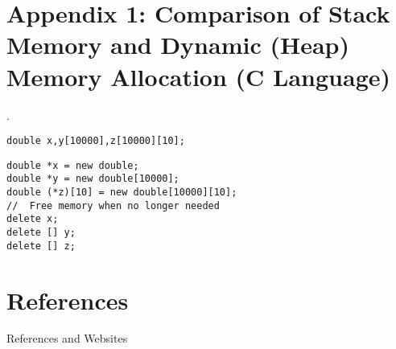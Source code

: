 \documentclass[aspectratio=169,dvipdfmx,cjk,handout,hyperref,8pt]{beamer} %
\newtheorem{thm}{Theorem}[section]
\theoremstyle{example}
\begin{document}
\section{Appendix 1: Comparison of Stack Memory and Dynamic (Heap) Memory Allocation (C Language)}
\begin{frame}{\thesection.~\insertsection} 
\begin{lstlisting}[basicstyle=\ttfamily\small, breaklines=true, frame=single,caption=Variable and Array Allocation Using Stack Memory (Example in C). Stack memory (in the stack region) is generally limited to around 10 MB on a laptop PC (quite small)~\cite{LemniscaterQiita}.]
double x,y[10000],z[10000][10];
\end{lstlisting}
\begin{lstlisting}[basicstyle=\ttfamily\small, breaklines=true, frame=single,caption=Dynamic Memory Allocation (Example in C++). The method for releasing memory differs between variables and arrays. Memory (in the heap region) can generally be allocated up to the GB order on a laptop PC~\cite{LemniscaterQiita}. The same can be done in C language using the malloc function.]
double *x = new double;
double *y = new double[10000]; 
double (*z)[10] = new double[10000][10];
//  Free memory when no longer needed
delete x;
delete [] y;
delete [] z;
\end{lstlisting}
\end{frame}

\section{References}
\begin{frame}[allowframebreaks]{References and Websites}
    \beamertemplatetextbibitems
    
    
\end{frame}





\end{document}
